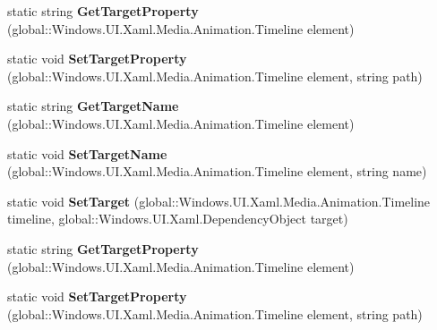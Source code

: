 \begin{DoxyCompactItemize}
static string {\bfseries Get\+Target\+Property} (global\+::\+Windows.\+U\+I.\+Xaml.\+Media.\+Animation.\+Timeline element)
\item 
\mbox{\label{class_windows_1_1_u_i_1_1_xaml_1_1_media_1_1_animation_1_1_storyboard_ab3c2752dde5914726dbdb8671f80b4bf}} 
static void {\bfseries Set\+Target\+Property} (global\+::\+Windows.\+U\+I.\+Xaml.\+Media.\+Animation.\+Timeline element, string path)
\item 
\mbox{\label{class_windows_1_1_u_i_1_1_xaml_1_1_media_1_1_animation_1_1_storyboard_a4ad4c5f27f472132b6e4ec18554505e0}} 
static string {\bfseries Get\+Target\+Name} (global\+::\+Windows.\+U\+I.\+Xaml.\+Media.\+Animation.\+Timeline element)
\item 
\mbox{\label{class_windows_1_1_u_i_1_1_xaml_1_1_media_1_1_animation_1_1_storyboard_a50a435394c414f84722c631eb3ce3840}} 
static void {\bfseries Set\+Target\+Name} (global\+::\+Windows.\+U\+I.\+Xaml.\+Media.\+Animation.\+Timeline element, string name)
\item 
\mbox{\label{class_windows_1_1_u_i_1_1_xaml_1_1_media_1_1_animation_1_1_storyboard_a9a120900e03e5275519d4f240ae6671b}} 
static void {\bfseries Set\+Target} (global\+::\+Windows.\+U\+I.\+Xaml.\+Media.\+Animation.\+Timeline timeline, global\+::\+Windows.\+U\+I.\+Xaml.\+Dependency\+Object target)
\item 
\mbox{\label{class_windows_1_1_u_i_1_1_xaml_1_1_media_1_1_animation_1_1_storyboard_a992ba47ffd0cf9810bb90b1fefa1b861}} 
static string {\bfseries Get\+Target\+Property} (global\+::\+Windows.\+U\+I.\+Xaml.\+Media.\+Animation.\+Timeline element)
\item 
\mbox{\label{class_windows_1_1_u_i_1_1_xaml_1_1_media_1_1_animation_1_1_storyboard_ab3c2752dde5914726dbdb8671f80b4bf}} 
static void {\bfseries Set\+Target\+Property} (global\+::\+Windows.\+U\+I.\+Xaml.\+Media.\+Animation.\+Timeline element, string path)

\end{DoxyCompactItemize}
